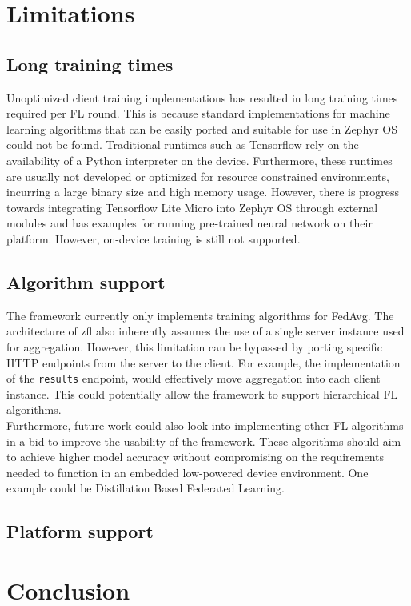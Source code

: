 \documentclass[12pt]{article}
\begin{document}
\pagebreak
\section{Limitations}
\subsection{Long training times}
Unoptimized client training implementations has resulted in long training times required per FL
round. This is because standard implementations for machine learning
algorithms that can be easily ported and suitable for use in Zephyr OS could not be found.
Traditional runtimes such as Tensorflow\cite{tensorflow2015-whitepaper} rely on the availability of a Python interpreter on
the device. Furthermore, these runtimes are usually not developed or optimized for resource
constrained environments, incurring a large binary size and high memory usage. However, there is
progress towards integrating Tensorflow Lite Micro into Zephyr OS through external modules
and has examples for running pre-trained neural network on their platform. However, on-device
training is still not supported.

\subsection{Algorithm support}
The framework currently only implements training algorithms for FedAvg. The architecture of zfl also
inherently assumes the use of a single server instance used for aggregation. However, this
limitation can be bypassed by porting specific HTTP endpoints from the server to the client. For
example, the implementation of the \verb|results| endpoint, would effectively move aggregation into
each client instance. This could potentially allow the framework to support hierarchical FL
algorithms\cite{rana_2023_hierarchical}.\\

Furthermore, future work could also look into implementing other FL algorithms in a bid to improve
the usability of the framework. These algorithms should aim to achieve higher model accuracy without
compromising on the requirements needed to function in an embedded low-powered device environment.
One example could be Distillation Based Federated Learning\cite{liu2022efficient}.

\subsection{Platform support}

\section{Conclusion}

\pagebreak
{}


\end{document}
